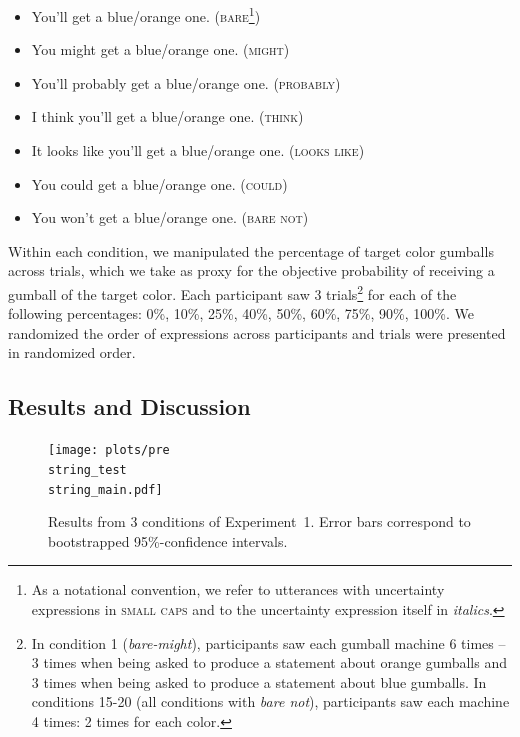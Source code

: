 \documentclass[man, floatsintext]{apa6}
\begin{document}
 \begin{itemize}
\item You'll get a blue/orange one. (\textsc{bare}\footnote{As a notational convention, we refer to utterances with uncertainty expressions in \textsc{small caps} and to the uncertainty expression itself in \textit{italics}. })
\item You might get a blue/orange one. (\textsc{might})
\item You'll probably get a blue/orange one. (\textsc{probably})
\item I think you'll get a blue/orange one. (\textsc{think})
\item It looks like you'll get a blue/orange one. (\textsc{looks like})
\item You could get a blue/orange one. (\textsc{could})
\item You won't get a blue/orange one. (\textsc{bare not})
\end{itemize}


\noindent Within each condition, we manipulated the percentage of target color gumballs across trials, which we take as proxy for the objective probability of receiving a gumball of the target color. 
Each participant saw 3 trials\footnote{In condition 1 (\textit{bare-might}), participants saw each gumball machine 6 times -- 3 times when being asked to produce a statement about orange gumballs and 3 times when being asked to produce a statement about blue gumballs. In conditions 15-20 (all conditions with \textit{bare not}), participants saw each machine 4 times: 2 times for each color.} 
for each of the following percentages: 0\%, 10\%, 25\%, 40\%, 50\%, 60\%, 75\%, 90\%, 100\%. We randomized the order of expressions across participants and trials were presented in randomized order.

\subsection{Results and Discussion}

\begin{figure}
\texttt{[image: plots/pre\\string\_test\\string\_main.pdf]} 
\caption{Results from 3 conditions of Experiment~1. Error bars correspond to bootstrapped 95\%-confidence intervals. \label{fig:norming-results-main} }
\end{figure}
\end{document}
